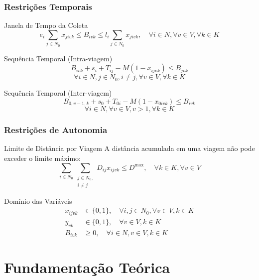 \documentclass[10pt]{beamer}
\begin{document}
\begin{frame}
\frametitle{Restrições Temporais}
\begin{block}{Janela de Tempo da Coleta}
$$e_i \sum_{j \in N_0} x_{jivk} \leq B_{ivk} \leq l_i \sum_{j \in N_0} x_{jivk}, \quad \forall i \in N, \forall v \in V, \forall k \in K$$
\end{block}

\begin{block}{Sequência Temporal (Intra-viagem)}
$$B_{ivk} + s_i + T_{ij} - M(1 - x_{ijvk}) \leq B_{jvk}$$
$$\forall i \in N, j \in N_0, i \neq j, \forall v \in V, \forall k \in K$$
\end{block}

\begin{block}{Sequência Temporal (Inter-viagem)}
$$B_{0,v-1,k} + s_0 + T_{0i} - M(1 - x_{0ivk}) \leq B_{ivk}$$
$$\forall i \in N, \forall v \in V, v > 1, \forall k \in K$$
\end{block}
\end{frame}

\begin{frame}
\frametitle{Restrições de Autonomia}
\begin{block}{Limite de Distância por Viagem}
A distância acumulada em uma viagem não pode exceder o limite máximo:
$$\sum_{i \in N_0} \sum_{\substack{j \in N_0,\\i \neq j}} D_{ij} x_{ijvk} \leq D^{\max}, \quad \forall k \in K, \forall v \in V$$
\end{block}

\begin{block}{Domínio das Variáveis}
\begin{align}
x_{ijvk} &\in \{0, 1\}, \quad \forall i,j \in N_0, \forall v \in V, k \in K \\
y_{vk} &\in \{0, 1\}, \quad \forall v \in V, k \in K \\
B_{ivk} &\geq 0, \quad \forall i \in N, v \in V, k \in K
\end{align}
\end{block}
\end{frame}

\section{Fundamentação Teórica}
\end{document}
